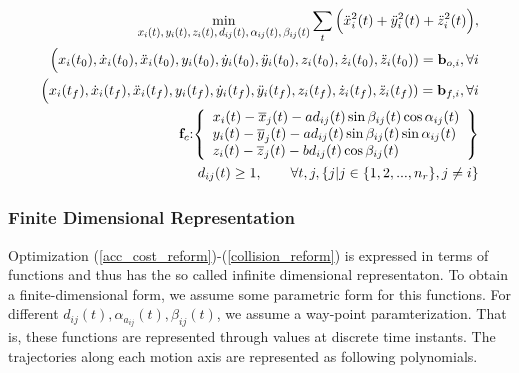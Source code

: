 \begin{subequations}
\begin{align}
\min_{ \scalebox{0.8}{$ x_{i}(t), y_{i}(t), z_{i}(t), d_{ij}(t),
\alpha_{ij}(t), \beta_{ij}(t)  $}}
\sum_t \Big(\ddot{x}^2_{i}(t)+\ddot{y}^2_{i}(t) + \ddot{z}^2_{i}(t) \Big), \label{acc_cost_reform}\\
\Big(x_i(t_0), \dot{x}_i(t_0), \ddot{x}_i(t_0), y_i(t_0), \dot{y}_i(t_0), \ddot{y}_i(t_0), z_i(t_0), \dot{z}_i(t_0), \ddot{z}_i(t_0)) = \textbf{b}_{o, i}, \forall i \label{initial_boundary_cond_reform} \\
\Big(x_i(t_f), \dot{x}_i(t_f), \ddot{x}_i(t_f), y_i(t_f), \dot{y}_i(t_f), \ddot{y}_i(t_f), z_i(t_f), \dot{z}_i(t_f), \ddot{z}_i(t_f)) = \textbf{b}_{f, i}, \forall i \label{final_boundary_cond_reform} \\
\textbf{f}_{c} \hspace{-0.1cm}: \hspace{-0.1cm}\left \{ \begin{array}{lcr}
x_{i}(t)-\overline{x}_{j}(t) -ad_{ij}(t)\sin{\beta_{ij}(t)}\cos{\alpha_{ij}}(t)\\
y_{i}(t)-\overline{y}_{j}(t) 
-ad_{ij}(t)\sin{\beta_{ij}(t)}\sin{\alpha_{ij}(t)} \\
z_{i}(t)-\overline{z}_{j}(t) -bd_{ij}(t)\cos{\beta_{ij}(t)}
\end{array} \right \} \label{coll_con} \\%
 d_{ij}(t) \geq 1, \qquad \forall t, j, \{j| j\in \{1,2,...,n_{r}\}, j \neq  i\} \label{collision_reform}
\end{align}
\end{subequations}

\subsubsection{Finite Dimensional Representation}
\noindent Optimization (\ref{acc_cost_reform})-(\ref{collision_reform}) is expressed in terms of functions and thus has the so called infinite dimensional representaton. To obtain a finite-dimensional form, we assume some parametric form for this functions. For
different $d_{ij}(t), \alpha_{a_{ij}}(t), \beta_{ij}(t) $, we assume a way-point paramterization. That is, these functions are represented through values at discrete time instants. The trajectories along each motion axis are represented as following polynomials.

